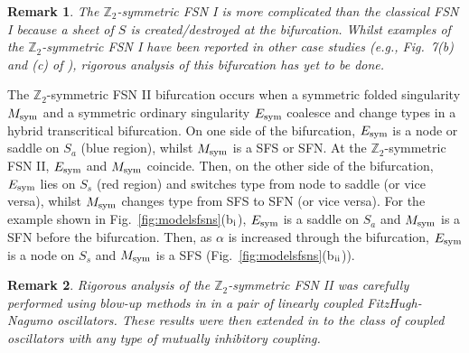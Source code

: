 \documentclass[10pt,onecolumn]{article}
\theoremstyle{plain}
\newtheorem{remark}{Remark}[section]
\begin{document}
\medskip
\begin{remark}
The $\mathbb Z_2$-symmetric FSN I is more complicated than the classical FSN I because a sheet of $S$ is created/destroyed at the bifurcation. Whilst examples of the $\mathbb Z_2$-symmetric FSN I have been reported in other case studies (e.g., Fig.~7(b) and (c) of \cite{Awal2024}), rigorous analysis of this bifurcation has yet to be done. 
\end{remark}

The $\mathbb Z_2$-symmetric FSN II bifurcation occurs when a symmetric folded singularity $M_{\rm sym}$ and a symmetric ordinary singularity $E_{\rm sym}$ coalesce and change types in a hybrid transcritical bifurcation. On one side of the bifurcation, $E_{\rm sym}$ is a node or saddle on $S_a$ (blue region), whilst $M_{\rm sym}$ is a SFS or SFN. 
At the $\mathbb Z_2$-symmetric FSN II, $E_{\rm sym}$ and $M_{\rm sym}$ coincide. 
Then, on the other side of the bifurcation, $E_{\rm sym}$ lies on $S_s$ (red region) and switches type from node to saddle (or vice versa), whilst $M_{\rm sym}$ changes type from SFS to SFN (or vice versa). 
For the example shown in Fig.~\ref{fig:modelsfsns}(b$_{\rm i}$), $E_{\rm sym}$ is a saddle on $S_a$ and $M_{\rm sym}$ is a SFN before the bifurcation.
Then, as $\alpha$ is increased through the bifurcation, $E_{\rm sym}$ is a node on $S_s$ and $M_{\rm sym}$ is a SFS (Fig.~\ref{fig:modelsfsns}(b$_{\rm ii}$)). 

\medskip
\begin{remark}
Rigorous analysis of the $\mathbb Z_2$-symmetric FSN II was carefully performed using blow-up methods in \cite{Kristiansen2023} in a pair of linearly coupled FitzHugh-Nagumo oscillators. These results were then extended in \cite{Pedersen2026} to the class of coupled oscillators with any type of mutually inhibitory coupling.
\end{remark}
\end{document}
